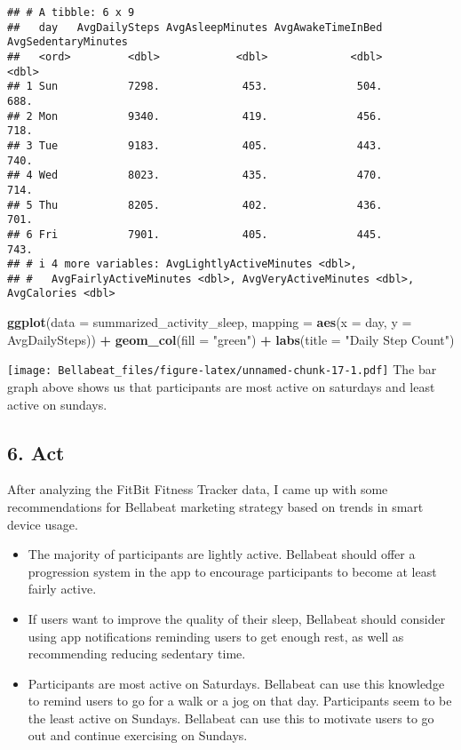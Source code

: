 \documentclass[
]{article}
\newenvironment{Shaded}{\begin{snugshade}}{\end{snugshade}}
\newcommand{\AttributeTok}[1]{\textcolor[rgb]{0.13,0.29,0.53}{#1}}
\newcommand{\FunctionTok}[1]{\textcolor[rgb]{0.13,0.29,0.53}{\textbf{#1}}}
\newcommand{\NormalTok}[1]{#1}
\newcommand{\SpecialCharTok}[1]{\textcolor[rgb]{0.81,0.36,0.00}{\textbf{#1}}}
\newcommand{\StringTok}[1]{\textcolor[rgb]{0.31,0.60,0.02}{#1}}
\providecommand{\tightlist}{%
  \setlength{\itemsep}{0pt}\setlength{\parskip}{0pt}}
\begin{document}
\begin{verbatim}
## # A tibble: 6 x 9
##   day   AvgDailySteps AvgAsleepMinutes AvgAwakeTimeInBed AvgSedentaryMinutes
##   <ord>         <dbl>            <dbl>             <dbl>               <dbl>
## 1 Sun           7298.             453.              504.                688.
## 2 Mon           9340.             419.              456.                718.
## 3 Tue           9183.             405.              443.                740.
## 4 Wed           8023.             435.              470.                714.
## 5 Thu           8205.             402.              436.                701.
## 6 Fri           7901.             405.              445.                743.
## # i 4 more variables: AvgLightlyActiveMinutes <dbl>,
## #   AvgFairlyActiveMinutes <dbl>, AvgVeryActiveMinutes <dbl>, AvgCalories <dbl>
\end{verbatim}

\begin{Shaded}
\begin{Highlighting}[]
\FunctionTok{ggplot}\NormalTok{(}\AttributeTok{data =}\NormalTok{ summarized\_activity\_sleep, }\AttributeTok{mapping =} \FunctionTok{aes}\NormalTok{(}\AttributeTok{x =}\NormalTok{ day, }\AttributeTok{y =}\NormalTok{ AvgDailySteps)) }\SpecialCharTok{+}
\FunctionTok{geom\_col}\NormalTok{(}\AttributeTok{fill =} \StringTok{"green"}\NormalTok{) }\SpecialCharTok{+} \FunctionTok{labs}\NormalTok{(}\AttributeTok{title =} \StringTok{"Daily Step Count"}\NormalTok{)}
\end{Highlighting}
\end{Shaded}

\texttt{[image: Bellabeat\_files/figure-latex/unnamed-chunk-17-1.pdf]}
The bar graph above shows us that participants are most active on
saturdays and least active on sundays.

\hypertarget{act}{%
\subsection{6. Act}\label{act}}

After analyzing the FitBit Fitness Tracker data, I came up with some
recommendations for Bellabeat marketing strategy based on trends in
smart device usage.

\begin{itemize}
\tightlist
\item
  The majority of participants are lightly active. Bellabeat should
  offer a progression system in the app to encourage participants to
  become at least fairly active.
\item
  If users want to improve the quality of their sleep, Bellabeat should
  consider using app notifications reminding users to get enough rest,
  as well as recommending reducing sedentary time.
\item
  Participants are most active on Saturdays. Bellabeat can use this
  knowledge to remind users to go for a walk or a jog on that day.
  Participants seem to be the least active on Sundays. Bellabeat can use
  this to motivate users to go out and continue exercising on Sundays.
\end{itemize}
\end{document}
